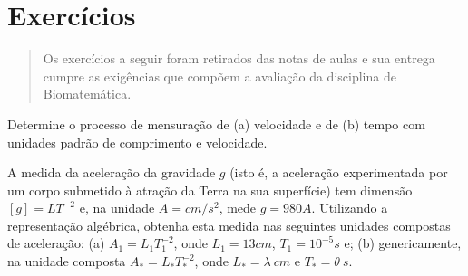 
\section{Exercícios}

\begin{quote}
Os exercícios a seguir foram retirados das notas de aulas \cite{jrcastro2020elementos} e sua entrega cumpre as exigências que compõem a avaliação da disciplina de Biomatemática.
\end{quote}

\begin{exercise}
Determine o processo de mensuração de (a) velocidade e de (b) tempo com unidades padrão de comprimento e velocidade.
\end{exercise}



\begin{exercise}
A medida da aceleração da gravidade \(g\) (isto é, a aceleração experimentada por um corpo submetido à atração da Terra na sua superfície) tem dimensão \([g] = LT^{-2}\) e, na unidade \(A = cm/ s^2\), mede \(g = 980 A\). Utilizando a representação algébrica, obtenha esta medida nas seguintes unidades compostas de aceleração: (a) \(A_1=L_1T_1^{-2}\), onde \(L_1 = 13 cm\), \(T_1 = 10^{-5} s\) e; (b) genericamente, na unidade composta \(A_{\ast} = L_{\ast} T_{\ast}^{-2}\), onde \(L_{\ast} = \lambda\ cm\) e \(T_{\ast} = \theta\ s\).
\end{exercise}

